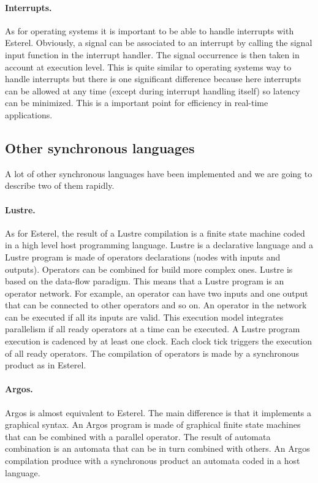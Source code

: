 \documentclass[10pt]{report}
\begin{document}
\paragraph{Interrupts.} As for operating systems it is important to be able to handle interrupts with Esterel. Obviously, a signal
can be associated to an interrupt by calling the signal input function in the interrupt handler. The signal occurrence is then
taken in account at execution level. This is quite similar to operating systems way to handle interrupts but there is one
significant difference because here interrupts can be allowed at any time (except during interrupt handling itself) so latency
can be minimized. This is a important point for efficiency in real-time applications.

\subsection{Other synchronous languages}

A lot of other synchronous languages have been implemented and we are going to describe two of them rapidly.

\paragraph{Lustre.} As for Esterel, the result of a Lustre compilation is a finite state machine coded in a high level host
programming language. Lustre is a declarative language and a Lustre program is made of operators declarations (nodes with inputs
and outputs). Operators can be combined for build more complex ones. Lustre is based on the data-flow paradigm. This means
that a Lustre program is an operator network. For example, an operator can have two inputs and one output that can be connected
to other operators and so on. An operator in the network can be executed if all its inputs are valid. This execution model
integrates parallelism if all ready operators at a time can be executed. A Lustre program execution is cadenced by at least one
clock. Each clock tick triggers the execution of all ready operators. The compilation of operators is made by a synchronous
product as in Esterel.

\paragraph{Argos.} Argos is almost equivalent to Esterel. The main difference is that it implements a graphical syntax. An
Argos program is made of graphical finite state machines that can be combined with a parallel operator. The result of automata
combination is an automata that can be in turn combined with others. An Argos compilation produce with a synchronous
product an automata coded in a host language.
\end{document}

